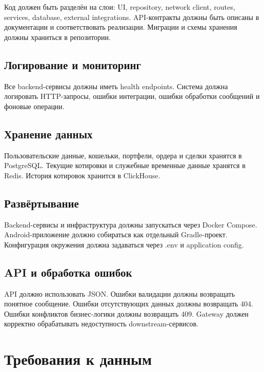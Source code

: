 \documentclass[12pt,a4paper]{article}
\begin{document}
Код должен быть разделён на слои: UI, repository, network client, routes, services,
database, external integrations. API-контракты должны быть описаны в документации и
соответствовать реализации. Миграции и схемы хранения должны храниться в
репозитории.

\subsection{Логирование и мониторинг}

Все backend-сервисы должны иметь health endpoints. Система должна логировать
HTTP-запросы, ошибки интеграции, ошибки обработки сообщений и фоновые операции.

\subsection{Хранение данных}

Пользовательские данные, кошельки, портфели, ордера и сделки хранятся в PostgreSQL.
Текущие котировки и служебные временные данные хранятся в Redis. История котировок
хранится в ClickHouse.

\subsection{Развёртывание}

Backend-сервисы и инфраструктура должны запускаться через Docker Compose.
Android-приложение должно собираться как отдельный Gradle-проект. Конфигурация
окружения должна задаваться через .env и application config.

\subsection{API и обработка ошибок}

API должно использовать JSON. Ошибки валидации должны возвращать понятное
сообщение. Ошибки отсутствующих данных должны возвращать 404. Ошибки конфликтов
бизнес-логики должны возвращать 409. Gateway должен корректно обрабатывать
недоступность downstream-сервисов.

\section{Требования к данным}
\end{document}
